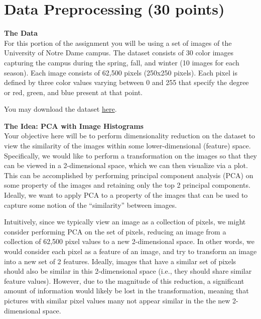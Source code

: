 \documentclass[paper=a4, fontsize=11pt]{scrartcl} %
\numberwithin{equation}{section} %
\numberwithin{figure}{section} %
\numberwithin{table}{section} %
\begin{document}
\newpage
\section{Data Preprocessing (30 points)}

\textbf{The Data}\\
For this portion of the assignment you will be using a set of images of the University of Notre Dame campus. The dataset consists of 30 color images capturing the campus during the spring, fall, and winter (10 images for each season). Each image consists of 62,500 pixels (250x250 pixels). Each pixel is defined by three color values varying between 0 and 255 that specify the degree or red, green, and blue present at that point.

\vspace{6pt}

You may download the dataset \href{https://github.com/cse40647/cse40647/blob/sp.14/assignment2/campus.zip}{here}.

\vspace{8pt}

\textbf{The Idea:  PCA with Image Histograms}\\
Your objective here will be to perform dimensionality reduction on the dataset to view the similarity of the images within some lower-dimensional (feature) space. Specifically, we would like to perform a transformation on the images so that they can be viewed in a 2-dimensional space, which we can then visualize via a plot. This can be accomplished by performing principal component analysis (PCA) on some property of the images and retaining only the top 2 principal components. Ideally, we want to apply PCA to a property of the images that can be used to capture some notion of the ``similarity'' between images.

\vspace{6pt}

Intuitively, since we typically view an image as a collection of pixels, we might consider performing PCA on the set of pixels, reducing an image from a collection of 62,500 pixel values to a new 2-dimensional space. In other words, we would consider each pixel as a feature of an image, and try to transform an image into a new set of 2 features. Ideally, images that have a similar set of pixels should also be similar in this 2-dimensional space (i.e., they should share similar feature values). However, due to the magnitude of this reduction, a significant amount of information would likely be lost in the transformation, meaning that pictures with similar pixel values many not appear similar in the the new 2-dimensional space.
\end{document}
